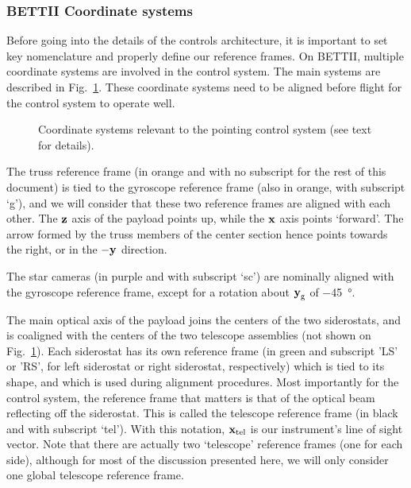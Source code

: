\subsubsection{BETTII Coordinate systems}

Before going into the details of the controls architecture, it is important to set key nomenclature and properly define our reference frames. On BETTII, multiple coordinate systems are involved in the control system. The main systems are described in Fig.~\ref{fig:CoordinateSystem}. These coordinate systems need to be aligned before flight for the control system to operate well. 
\begin{figure}[!h]
	\centering
	
	\caption[BETTII coordinate systems]{Coordinate systems relevant to the pointing control system (see text for details).}
	\label{fig:CoordinateSystem}
    \end{figure}

The truss reference frame (in orange and with no subscript for the rest of this document) is tied to the gyroscope reference frame (also in orange, with subscript `g'), and we will consider that these two reference frames are aligned with each other. The $\textrm{\textbf{z}}$ axis of the payload points up, while the $\textrm{\textbf{x}}$ axis points `forward'. The arrow formed by the truss members of the center section hence points towards the right, or in the $-\textrm{\textbf{y}}$ direction. 

The star cameras (in purple and with subscript `sc') are nominally aligned with the gyroscope reference frame, except for a rotation about $\textrm{\textbf{y}}_{\textrm{g}}$ of \SI{-45}{\degree}.

The main optical axis of the payload joins the centers of the two siderostats, and is coaligned with the centers of the two telescope assemblies (not shown on Fig.~\ref{fig:CoordinateSystem}). Each siderostat has its own reference frame (in green and subscript 'LS' or 'RS', for left siderostat or right siderostat, respectively) which is tied to its shape, and which is used during alignment procedures. Most importantly for the control system, the reference frame that matters is that of the optical beam reflecting off the siderostat. This is called the telescope reference frame (in black and with subscript `tel'). With this notation, $\textrm{\textbf{x}}_{\textrm{tel}}$ is our instrument's line of sight vector. Note that there are actually two `telescope' reference frames (one for each side), although for most of the discussion presented here, we will only consider one global telescope reference frame. 

